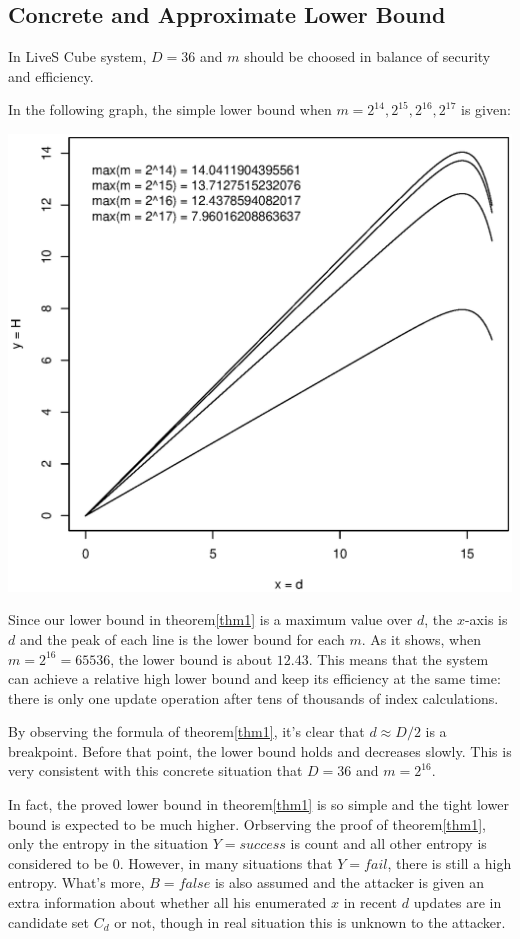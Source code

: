 \documentclass[10pt,a4paper]{article}
\begin{document}
	\subsection{Concrete and Approximate Lower Bound}
		In LiveS Cube system, $D = 36$ and $m$ should be
		choosed in balance of security and efficiency.
		
		In the following graph, the simple lower
		bound when $m = 2^{14}, 2^{15}, 2^{16}, 2^{17}$ is given:
		
		\begin{center}
		\includegraphics[scale=0.5]{lb_m.eps}
		\end{center}
		
		Since our lower bound in theorem\ref{thm1} is a maximum value
		over $d$, the $x$-axis is $d$ and the peak of each line
		is the lower bound for each $m$. As it shows, when $m = 2^{16} = 65536$, the lower
		bound is about $12.43$. This means that the system can achieve
		a relative high lower bound and keep its efficiency at the same time:
		there is only one update operation after tens of thousands of index calculations.
		
		By observing the formula
		of theorem\ref{thm1}, it's clear that $d \approx D/2$ is a
		breakpoint. Before that point, the lower bound holds and
		decreases slowly. This is very consistent with this
		concrete situation that $D = 36$ and $m = 2^{16}$.
		
		In fact, the proved lower bound in theorem\ref{thm1} is so
		simple and the tight lower bound is expected to be much higher.
		Orbserving the proof of theorem\ref{thm1}, only the
		entropy in the situation $Y = success$ is count and
		all other entropy is considered to be $0$. However, in
		many situations that $Y = fail$, there is still a high entropy.
		What's more, $B = false$ is also assumed and the attacker is
		given an extra information about whether all his enumerated $x$
		in recent $d$ updates are in candidate set $C_d$ or not, though
		in real situation this is unknown to the attacker.
		
\end{document}
